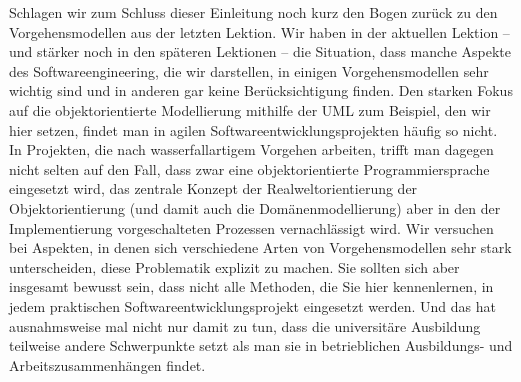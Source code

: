 Schlagen 
wir zum Schluss dieser Einleitung noch kurz den Bogen zurück zu den Vorgehensmodellen aus der letzten Lektion. Wir haben in der aktuellen Lektion – und stärker noch in den späteren Lektionen – die Situation, dass manche Aspekte des Softwareengineering, die wir darstellen, in einigen Vorgehensmodellen sehr wichtig sind und in anderen gar keine Berücksichtigung finden. Den starken Fokus auf die objektorientierte Modellierung mithilfe der UML zum Beispiel, den wir hier setzen, findet man in agilen Softwareentwicklungsprojekten häufig so nicht. In Projekten, die nach wasserfallartigem Vorgehen arbeiten, trifft man dagegen nicht selten auf den Fall, dass zwar eine objektorientierte Programmiersprache eingesetzt wird, das zentrale Konzept der Realweltorientierung der Objektorientierung (und damit auch die Domänenmodellierung) aber in den der Implementierung vorgeschalteten Prozessen vernachlässigt wird. Wir versuchen bei Aspekten, in denen sich verschiedene Arten von Vorgehensmodellen sehr stark unterscheiden, diese Problematik explizit zu machen. Sie sollten sich aber insgesamt bewusst sein, dass nicht alle Methoden, die Sie hier kennenlernen, in jedem praktischen Softwareentwicklungsprojekt eingesetzt werden. Und das hat ausnahmsweise mal nicht nur damit zu tun, dass die universitäre Ausbildung teilweise andere Schwerpunkte setzt als man sie in betrieblichen Ausbildungs- und Arbeitszusammenhängen findet.

